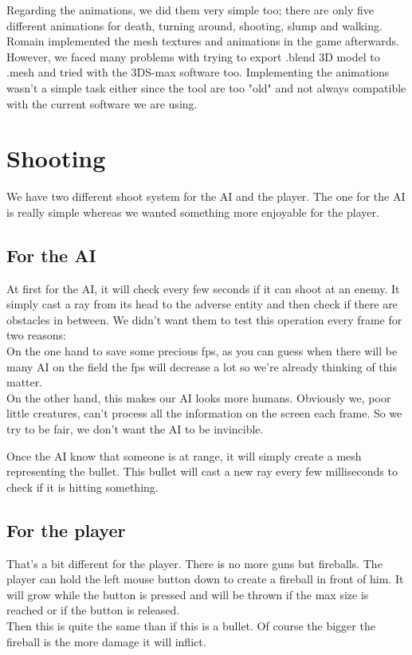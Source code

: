 \documentclass[article]{report}             %
\begin{document}
Regarding the animations, we did them very simple too; there are only five different animations for death, turning around, shooting, slump and walking. Romain implemented the mesh textures and animations in the game afterwards.\\

However, we faced many problems with trying to export .blend 3D model to .mesh and tried with the 3DS-max software too. Implementing the animations wasn't a simple task either since the tool are too "old" and not always compatible with the current software we are using.
			\section{Shooting}
				We have two different shoot system for the AI and the player. The one for the AI is really simple whereas we wanted something more enjoyable for the player.
				\subsection{For the AI}
					At first for the AI, it will check every few seconds if it can shoot at an enemy. It simply cast a ray from its head to the adverse entity and then check if there are obstacles in between. We didn't want them to test this operation every frame for two reasons:\\
On the one hand to save some precious fps, as you can guess when there will be many AI on the field the fps will decrease a lot so we're already thinking of this matter.\\
On the other hand, this makes our AI looks more humans. Obviously we, poor little creatures, can't process all the information on the screen each frame. So we try to be fair, we don't want the AI to be invincible.

Once the AI know that someone is at range, it will simply create a mesh representing the bullet. This bullet will cast a new ray every few milliseconds to check if it is hitting something.
				\subsection{For the player}
					That's a bit different for the player. There is no more guns but fireballs. The player can hold the left mouse button down to create a fireball in front of him. It will grow while the button is pressed and will be thrown if the max size is reached or if the button is released.\\
Then this is quite the same than if this is a bullet. Of course the bigger the fireball is the more damage it will inflict.\\
\end{document}
